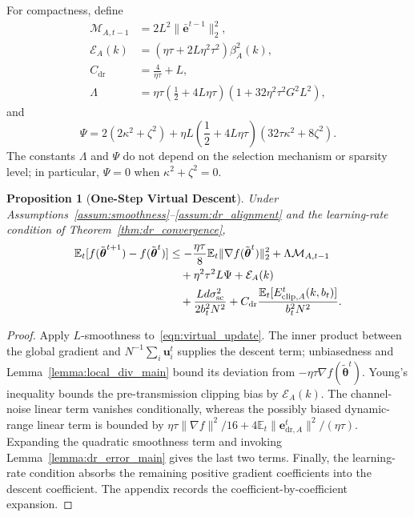 \documentclass[journal]{IEEEtran}
\newenvironment{revisionblock}{\begingroup\color{revisionred}}{\endgroup}
\newtheorem{proposition}{Proposition}
\begin{document}
\begin{revisionblock}
For compactness, define
{
\begin{align}
	\mathcal{M}_{A,t-1}&=2L^2\|\bar{\mathbf{e}}^{t-1}\|_2^2,\\
	\mathcal{E}_A(k)&=(\eta\tau+2L\eta^2\tau^2)\beta_A^2(k),\\
	C_{\mathrm{dr}}&=\frac{4}{\eta\tau}+L,\\
	\Lambda&=\eta\tau\left(\frac12+4L\eta\tau\right)
	\left(1+32\eta^2\tau^2G^2L^2\right),
	\label{eqn:descent_constants}
\end{align}
}
and
{
\begin{equation}
	\Psi
	=2(2\kappa^2+\zeta^2)
	+\eta L\left(\frac12+4L\eta\tau\right)
	(32\tau\kappa^2+8\zeta^2).
	\label{eqn:psi}
\end{equation}
}
The constants $\Lambda$ and $\Psi$ do not depend on the selection mechanism or sparsity level; in particular, $\Psi=0$ when $\kappa^2+\zeta^2=0$.

\begin{proposition}[\bf One-Step Virtual Descent]
\label{prop:one_step_descent}
Under Assumptions~\ref{assum:smoothness}--\ref{assum:dr_alignment} and the learning-rate condition of Theorem~\ref{thm:dr_convergence},
{
\begin{align}
	\mathbb{E}_t[f(\tilde{\boldsymbol{\theta}}^{t+1})
	-f(\tilde{\boldsymbol{\theta}}^t)]
	&\le-\frac{\eta\tau}{8}
	\mathbb{E}_t\|\nabla f(\tilde{\boldsymbol{\theta}}^t)\|_2^2
		+\Lambda\mathcal{M}_{A,t-1}
	\notag\\
		&\quad+\eta^2\tau^2L\Psi
	+\mathcal{E}_A(k)
	\notag\\
	&\quad+\frac{Ld\sigma_{\mathrm{sc}}^2}{2b_t^2N^2}
	+C_{\mathrm{dr}}
	\frac{\mathbb{E}_t[E_{\mathrm{clip},A}^t(k,b_t)]}{b_t^2N^2}.
	\label{eqn:one_step_descent}
\end{align}
}
\end{proposition}
\begin{proof}
Apply $L$-smoothness to~\eqref{eqn:virtual_update}. The inner product between the global gradient and $N^{-1}\sum_i\mathbf{u}_i^t$ supplies the descent term; unbiasedness and Lemma~\ref{lemma:local_div_main} bound its deviation from $-\eta\tau\nabla f(\tilde{\boldsymbol{\theta}}^t)$. Young's inequality bounds the pre-transmission clipping bias by $\mathcal{E}_A(k)$. The channel-noise linear term vanishes conditionally, whereas the possibly biased dynamic-range linear term is bounded by $\eta\tau\|\nabla f\|^2/16+4\mathbb{E}_t\|\mathbf{e}_{\mathrm{dr},A}^t\|^2/(\eta\tau)$. Expanding the quadratic smoothness term and invoking Lemma~\ref{lemma:dr_error_main} gives the last two terms. Finally, the learning-rate condition absorbs the remaining positive gradient coefficients into the descent coefficient. The appendix records the coefficient-by-coefficient expansion.
\end{proof}


\end{revisionblock}
\end{document}
